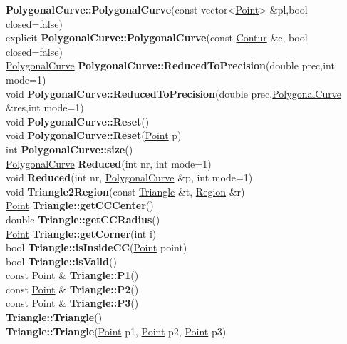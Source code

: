 \documentclass[10pt,titlepage]{article}
\def\functionlistentry#1#2#3#4#5#6{\noindent #1 {\bf #2}(#3) \dotfill #6\\}
\begin{document}
{{\functionlistentry{}{PolygonalCurve::PolygonalCurve}{const vector<\hyperlink{Point}{Point}> \&pl,bool closed=false}{595}{geoObject}{}
\functionlistentry{explicit}{PolygonalCurve::PolygonalCurve}{const \hyperlink{Contur}{Contur} \&c, bool closed=false}{596}{geoObject}{}
\functionlistentry{\hyperlink{PolygonalCurve}{PolygonalCurve}}{PolygonalCurve::ReducedToPrecision}{double prec,int mode=1}{609}{geoObject}{}
\functionlistentry{void}{PolygonalCurve::ReducedToPrecision}{double prec,\hyperlink{PolygonalCurve}{PolygonalCurve} \&res,int mode=1}{610}{geoObject}{}
\functionlistentry{void}{PolygonalCurve::Reset}{}{602}{geoObject}{}
\functionlistentry{void}{PolygonalCurve::Reset}{\hyperlink{Point}{Point} p}{603}{geoObject}{}
\functionlistentry{int}{PolygonalCurve::size}{}{597}{geoObject}{}
\functionlistentry{\hyperlink{PolygonalCurve}{PolygonalCurve}}{Reduced}{int nr, int mode=1}{607}{geoObject}{}
\functionlistentry{void}{Reduced}{int nr, \hyperlink{PolygonalCurve}{PolygonalCurve} \&p, int mode=1}{608}{geoObject}{}
\functionlistentry{void}{Triangle2Region}{const \hyperlink{Triangle}{Triangle} \&t, \hyperlink{Region}{Region} \&r}{590}{geoObject}{}
\functionlistentry{\hyperlink{Point}{Point}}{Triangle::getCCCenter}{}{587}{geoObject}{}
\functionlistentry{double}{Triangle::getCCRadius}{}{588}{geoObject}{}
\functionlistentry{\hyperlink{Point}{Point}}{Triangle::getCorner}{int i}{583}{geoObject}{}
\functionlistentry{bool}{Triangle::isInsideCC}{\hyperlink{Point}{Point} point}{589}{geoObject}{}
\functionlistentry{bool}{Triangle::isValid}{}{582}{geoObject}{}
\functionlistentry{const \hyperlink{Point}{Point} \&}{Triangle::P1}{}{584}{geoObject}{}
\functionlistentry{const \hyperlink{Point}{Point} \&}{Triangle::P2}{}{585}{geoObject}{}
\functionlistentry{const \hyperlink{Point}{Point} \&}{Triangle::P3}{}{586}{geoObject}{}
\functionlistentry{}{Triangle::Triangle}{}{580}{geoObject}{}
\functionlistentry{}{Triangle::Triangle}{\hyperlink{Point}{Point} p1, \hyperlink{Point}{Point} p2, \hyperlink{Point}{Point} p3}{581}{geoObject}{}

}}
\end{document}
